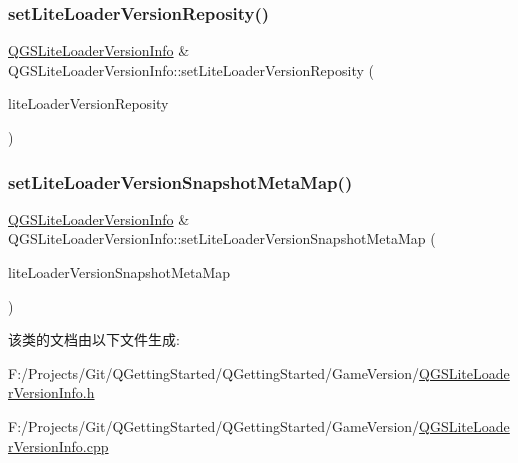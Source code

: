 \mbox{\label{class_q_g_s_lite_loader_version_info_a9ca55492c4767fe4b4cd9e802692b81a}} 
\subsubsection{\texorpdfstring{set\+Lite\+Loader\+Version\+Reposity()}{setLiteLoaderVersionReposity()}}
{\footnotesize\ttfamily \mbox{\hyperlink{class_q_g_s_lite_loader_version_info}{Q\+G\+S\+Lite\+Loader\+Version\+Info}} \& Q\+G\+S\+Lite\+Loader\+Version\+Info\+::set\+Lite\+Loader\+Version\+Reposity (\begin{DoxyParamCaption}\item[{const \mbox{\hyperlink{class_q_g_s_lite_loader_version_reposity}{Q\+G\+S\+Lite\+Loader\+Version\+Reposity}} \&}]{lite\+Loader\+Version\+Reposity }\end{DoxyParamCaption})}

\mbox{\label{class_q_g_s_lite_loader_version_info_a0bc7df758f0a72055ca5d9af8042a057}} 
\subsubsection{\texorpdfstring{set\+Lite\+Loader\+Version\+Snapshot\+Meta\+Map()}{setLiteLoaderVersionSnapshotMetaMap()}}
{\footnotesize\ttfamily \mbox{\hyperlink{class_q_g_s_lite_loader_version_info}{Q\+G\+S\+Lite\+Loader\+Version\+Info}} \& Q\+G\+S\+Lite\+Loader\+Version\+Info\+::set\+Lite\+Loader\+Version\+Snapshot\+Meta\+Map (\begin{DoxyParamCaption}\item[{const Q\+Map$<$ Q\+String, \mbox{\hyperlink{class_q_g_s_lite_loader_version_meta}{Q\+G\+S\+Lite\+Loader\+Version\+Meta}} $>$ \&}]{lite\+Loader\+Version\+Snapshot\+Meta\+Map }\end{DoxyParamCaption})}



该类的文档由以下文件生成\+:\begin{DoxyCompactItemize}
\item 
F\+:/\+Projects/\+Git/\+Q\+Getting\+Started/\+Q\+Getting\+Started/\+Game\+Version/\mbox{\hyperlink{_q_g_s_lite_loader_version_info_8h}{Q\+G\+S\+Lite\+Loader\+Version\+Info.\+h}}\item 
F\+:/\+Projects/\+Git/\+Q\+Getting\+Started/\+Q\+Getting\+Started/\+Game\+Version/\mbox{\hyperlink{_q_g_s_lite_loader_version_info_8cpp}{Q\+G\+S\+Lite\+Loader\+Version\+Info.\+cpp}}\end{DoxyCompactItemize}
